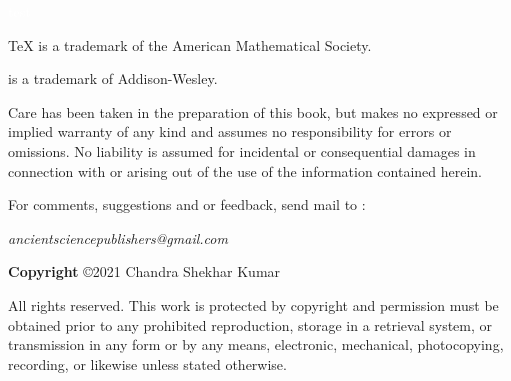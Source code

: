 \thispagestyle{empty}
\textcolor{white}{test}

\vspace{-6mm}

\noindent \TeX{} is a trademark of the American Mathematical Society.

\vspace{2mm}

\noindent \MF{} is a trademark of Addison-Wesley.

\vspace{6mm}

Care has been taken in the preparation of this book, but makes no expressed or implied warranty of any kind and assumes no responsibility for errors or omissions. No liability is assumed for incidental or consequential damages in connection with or arising out of the use of the information contained herein.

\vspace{0.8cm}

\noindent For comments, suggestions and or feedback, send mail to :
\begin{center}
{\color{BurntOrange}\emph{ancientsciencepublishers@gmail.com}}
\end{center}

\vspace{1in}



\begin{comment}
\begin{flushleft}
ISBN-13:   978-9354450600  \\
ISBN-10:  9354450601    
\end{flushleft}
\end{comment}

\vspace{2in}

\noindent \textbf{Copyright} \copyright 2021 Chandra Shekhar Kumar

\vspace{0.8cm}

\indent All rights reserved. This work is protected by copyright and permission must be obtained prior to any prohibited reproduction, storage in a retrieval system, or transmission in any form or by any means, electronic, mechanical, photocopying, recording, or likewise unless stated otherwise.


\newpage
\clearpage
